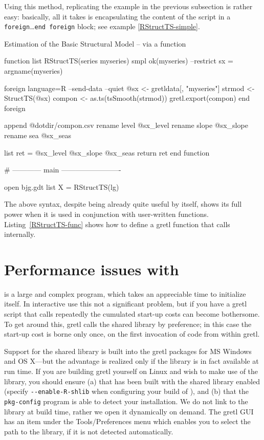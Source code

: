 Using this method, replicating the example in the previous subsection
is rather easy: basically, all it takes is encapsulating the content
of the  script in a \texttt{foreign}\ldots\texttt{end foreign}
block; see example \ref{RStructTS-simple}.

\begin{script}[htbp]
  \caption{Estimation of the Basic Structural Model -- via a function}
\begin{scode}
function list RStructTS(series myseries)
    smpl ok(myseries) --restrict
    sx = argname(myseries)

    foreign language=R --send-data --quiet
        @sx <- gretldata[, "myseries"]
        strmod <- StructTS(@sx)
        compon <- as.ts(tsSmooth(strmod))
        gretl.export(compon)
    end foreign

    append @dotdir/compon.csv
    rename level @sx_level
    rename slope @sx_slope
    rename sea @sx_seas

    list ret = @sx_level @sx_slope @sx_seas
    return ret
end function

# ------------ main -------------------------

open bjg.gdt
list X = RStructTS(lg)
\end{scode}

\label{RStructTS-func}
\end{script}

The above syntax, despite being already quite useful by itself, shows
its full power when it is used in conjunction with user-written
functions.  Listing~\ref{RStructTS-func} shows how to define a
gretl function that calls  internally.

\section{Performance issues with }
\label{sec:R-performance}

 is a large and complex program, which takes an appreciable
time to initialize itself.  In interactive use this not a significant
problem, but if you have a gretl script that calls  repeatedly
the cumulated start-up costs can become bothersome.  To get around
this, gretl calls the  shared library by preference; in this
case the start-up cost is borne only once, on the first invocation of
 code from within gretl.

Support for the  shared library is built into the gretl
packages for MS Windows and OS X---but the advantage is realized
only if the library is in fact available at run time.  If you are
building gretl yourself on Linux and wish to make use of the
 library, you should ensure (a) that  has been built
with the shared library enabled (specify \verb|--enable-R-shlib| when
configuring your build of ), and (b) that the \verb|pkg-config|
program is able to detect your  installation.  We do not link
to the  library at build time, rather we open it dynamically on
demand. The gretl GUI has an item under the
\textsf{Tools/Preferences} menu which enables you to select the
path to the library, if it is not detected automatically.  

